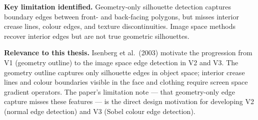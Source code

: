 \documentclass[11pt, a4paper]{article}
\begin{document}
\textbf{Key limitation identified.} Geometry-only silhouette detection captures boundary edges between front- and back-facing polygons, but misses interior crease lines, colour edges, and texture discontinuities. Image space methods recover interior edges but are not true geometric silhouettes.

\textbf{Relevance to this thesis.} Isenberg et al.\ (2003) motivate the progression from V1 (geometry outline) to the image space edge detection in V2 and V3. The geometry outline captures only silhouette edges in object space; interior crease lines and colour boundaries visible in the face and clothing require screen space gradient operators. The paper's limitation note --- that geometry-only edge capture misses these features --- is the direct design motivation for developing V2 (normal edge detection) and V3 (Sobel colour edge detection).
\end{document}
